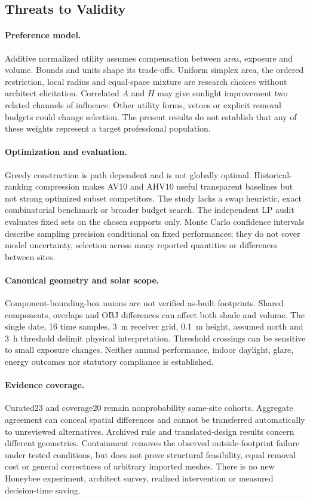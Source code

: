 \documentclass{llncs}
\begin{document}
\subsection{Threats to Validity}
\paragraph{Preference model.} Additive normalized utility assumes compensation between area, exposure and volume. Bounds and units shape its trade-offs. Uniform simplex area, the ordered restriction, local radius and equal-space mixture are research choices without architect elicitation. Correlated $A$ and $H$ may give sunlight improvement two related channels of influence. Other utility forms, vetoes or explicit removal budgets could change selection. The present results do not establish that any of these weights represent a target professional population.

\paragraph{Optimization and evaluation.} Greedy construction is path dependent and is not globally optimal. Historical-ranking compression makes AV10 and AHV10 useful transparent baselines but not strong optimized subset competitors. The study lacks a swap heuristic, exact combinatorial benchmark or broader budget search. The independent LP audit evaluates fixed sets on the chosen supports only. Monte Carlo confidence intervals describe sampling precision conditional on fixed performances; they do not cover model uncertainty, selection across many reported quantities or differences between sites.

\paragraph{Canonical geometry and solar scope.} Component-bounding-box unions are not verified as-built footprints. Shared components, overlaps and OBJ differences can affect both shade and volume. The single date, 16 time samples, 3~m receiver grid, 0.1~m height, assumed north and 3~h threshold delimit physical interpretation. Threshold crossings can be sensitive to small exposure changes. Neither annual performance, indoor daylight, glare, energy outcomes nor statutory compliance is established.

\paragraph{Evidence coverage.} Curated23 and coverage20 remain nonprobability same-site cohorts. Aggregate agreement can conceal spatial differences and cannot be transferred automatically to unreviewed alternatives. Archived rule and translated-design results concern different geometries. Containment removes the observed outside-footprint failure under tested conditions, but does not prove structural feasibility, equal removal cost or general correctness of arbitrary imported meshes. There is no new Honeybee experiment, architect survey, realized intervention or measured decision-time saving.
\end{document}

